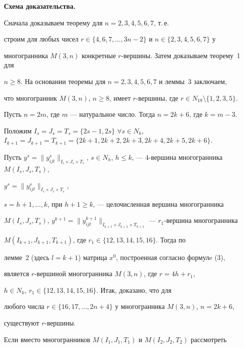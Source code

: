 {\bf Схема доказательства.}


Сначала доказываем теорему для $n=2,3,4,5,6,7$, т.\,е.


строим для любых чисел $r\in\{4,6,7,\dotsc,3n-2\}$ и $n\in\{2,3,4,5,6,7\}$ у


многогранника $M(3,n)$ конкретные $r$-вершины. Затем доказываем теорему~1 для


$n\geq 8.$ На основании теоремы для $n=2,3,4,5,6,7$ и леммы~3 заключаем,


что многогранник $M(3,n)$, $n\geq 8$, имеет $r$-вершины, где $r\in N_{19}


\setminus \{1,2,3,5\}.$





Пусть $n=2m$, где $m$ --- натуральное число. Тогда $n=2k+6$, где $k=m-3$.


Положим $I_s=J_s=T_s=\{2s-1,2s\}$ $\forall s\in N_k,$ $I_{k+1}=J_{k+1}=


T_{k+1}=\{2k+1,2k+2,2k+3,2k+4,2k+5,2k+6\}.$





Пусть $y^s=\|y^s_{ijt}\|_{I_s\times J_s\times T_s}$, $s


\in N_h$, $h\leq k$, --- 4-вершина многогранника $M(I_s,J_s,T_s)$,


$y^s=\|y^s_{ijt}\|_{I_s\times J_s\times T_s}$,


$s=h+1,\dotsc,k$, при $h+1\geq k$, --- целочисленная вершина многогранника


$M(I_s,J_s,T_s)$, $y^{k+1}=\|y^{k+1}_{ijt}\|_{I_{k+1}


\times J_{k+1}\times T_{k+1}}$ --- $r_1$-вершина многогранника


$M(I_{k+1},J_{k+1},T_{k+1})$, где $r_1\in\{12,13,14,15,16\}.$ Тогда по


лемме~2 (здесь $l=k+1$) матрица $x^0$, построенная согласно формулe (3),


является $r$-вершиной многогранника $M(3,n)$, где $r=4h+r_1$,


$h\in N_k$, $r_1\in\{12,13,14,15,16\}.$ Итак, доказано, что для


любого числа $r\in\{16,17,\dotsc,2n+4\}$ у многогранника $M(3,n)$, $n=2k+6,$


существуют $r$-вершины.





Если вместо многогранников $M(I_1,J_1,T_1)$ и $M(I_2,J_2,T_2)$ рассмотреть


